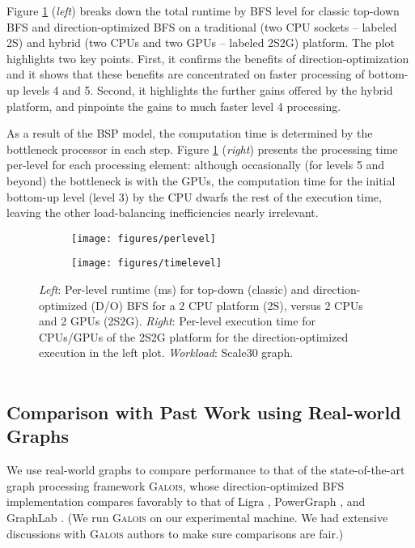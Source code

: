 \documentclass{llncs}
\begin{document}
Figure \ref{fig:level} (\textit{left}) breaks down the total runtime by BFS level for classic top-down BFS and direction-optimized BFS on a traditional (two CPU sockets -- labeled 2S) and hybrid (two CPUs and two GPUs -- labeled 2S2G) platform. The plot highlights two key points. First, it confirms the benefits of direction-optimization and it shows that these benefits are concentrated on faster processing of bottom-up levels 4 and 5. Second, it highlights the further gains offered by the hybrid platform, and pinpoints the gains to much faster level 4 processing.

As a result of the BSP model, the computation time is determined by the bottleneck processor in each step. Figure \ref{fig:level} (\textit{right}) presents the processing time per-level for each processing element: although occasionally (for levels 5 and beyond) the bottleneck is with the GPUs, the computation time for the initial bottom-up level (level 3) by the CPU dwarfs the rest of the execution time, leaving the other load-balancing inefficiencies nearly irrelevant.

\begin{figure}\centering \begin{subfigure}{.5\textwidth}\centering \texttt{[image: figures/perlevel]}\end{subfigure}\begin{subfigure}{.5\textwidth}\centering \texttt{[image: figures/timelevel]}\end{subfigure}\caption{\textit{Left}: Per-level runtime (ms) for top-down (classic) and direction-optimized (D/O) BFS for a 2 CPU platform (2S), versus 2 CPUs and 2 GPUs (2S2G). \textit{Right}: Per-level execution time for CPUs/GPUs of the 2S2G platform for the direction-optimized execution in the left plot. \textit{Workload}: Scale30 graph.\\\\}\label{fig:level}\end{figure}
\subsection{Comparison with Past Work using Real-world Graphs}\label{sec:realworld}We use real-world graphs to compare performance to that of the state-of-the-art graph processing framework \textsc{Galois}, whose direction-optimized BFS implementation compares favorably \cite{nguyen2013lightweight} to that of Ligra \cite{shun2013ligra}, PowerGraph \cite{gonzalez2012powergraph}, and GraphLab \cite{low2014graphlab}. (We run \textsc{Galois} on our experimental machine. We had extensive discussions with \textsc{Galois} authors to make sure comparisons are fair.) 
\end{document}

